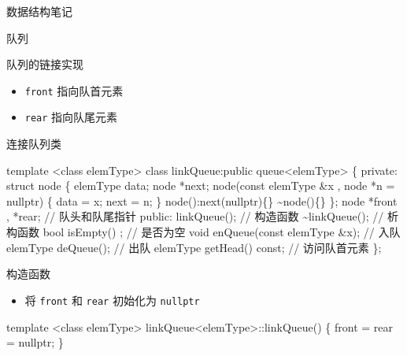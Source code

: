 \documentclass[
  ignorenonframetext,
]{beamer}
\newenvironment{Shaded}{}{}
\newcommand{\NormalTok}[1]{#1}
\providecommand{\tightlist}{%
  \setlength{\itemsep}{0pt}\setlength{\parskip}{0pt}}
\begin{document}
\begin{frame}[fragile]{数据结构笔记}
\begin{block}{队列}
\begin{block}{队列的链接实现}
\begin{itemize}
  \begin{itemize}
  \tightlist
  \item
    \texttt{front} 指向队首元素
  \item
    \texttt{rear} 指向队尾元素
  \end{itemize}
\end{itemize}

\begin{block}{连接队列类}
\protect{}\label{ux8fdeux63a5ux961fux5217ux7c7b}
\begin{Shaded}
\begin{Highlighting}[]
\NormalTok{template \textless{}class elemType\textgreater{}}
\NormalTok{class linkQueue:public queue\textless{}elemType\textgreater{}}
\NormalTok{\{}
\NormalTok{  private:}
\NormalTok{    struct node}
\NormalTok{    \{}
\NormalTok{      elemType data;}
\NormalTok{      node *next;}
\NormalTok{      node(const elemType \&x , node *n = nullptr)}
\NormalTok{      \{}
\NormalTok{        data = x;}
\NormalTok{        next = n;}
\NormalTok{      \}}
\NormalTok{      node():next(nullptr)\{\}}
\NormalTok{      \textasciitilde{}node()\{\}}
\NormalTok{    \};}
\NormalTok{    node *front , *rear;                // 队头和队尾指针}
\NormalTok{  public:}
\NormalTok{    linkQueue();                       // 构造函数}
\NormalTok{    \textasciitilde{}linkQueue();                      // 析构函数}
\NormalTok{    bool isEmpty() ;              // 是否为空}
\NormalTok{    void enQueue(const elemType \&x);   // 入队}
\NormalTok{    elemType deQueue();                // 出队}
\NormalTok{    elemType getHead() const;          // 访问队首元素}
\NormalTok{\};}
\end{Highlighting}
\end{Shaded}

\begin{block}{构造函数}
\protect{}\label{ux6784ux9020ux51fdux6570-6}
\begin{itemize}
\tightlist
\item
  将 \texttt{front} 和 \texttt{rear} 初始化为 \texttt{nullptr}
\end{itemize}

\begin{Shaded}
\begin{Highlighting}[]
\NormalTok{template \textless{}class elemType\textgreater{}}
\NormalTok{linkQueue\textless{}elemType\textgreater{}::linkQueue()}
\NormalTok{\{}
\NormalTok{  front = rear = nullptr;}
\NormalTok{\}}
\end{Highlighting}
\end{Shaded}
\end{block}


\end{block}
\end{block}
\end{block}
\end{frame}
\end{document}

